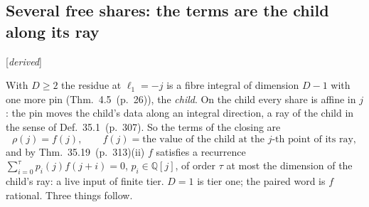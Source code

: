 \documentclass[11pt]{article}
\newcommand{\status}[1]{\hfill{\small[\textit{#1}]}}
\newcommand{\hb}[2]{#1~(p.~#2)}   %
\theoremstyle{plain}
\theoremstyle{remark}
\begin{document}
\subsection{Several free shares: the terms are the child along its ray}\status{derived}

With $D\ge2$ the residue at $\ell_1=-j$ is a fibre integral of dimension $D-1$ with one more pin (Thm.~\hb{4.5}{26}), the \emph{child}. On the child every share is affine in $j$: the pin moves the child's data along an integral direction, a ray of the child in the sense of Def.~\hb{35.1}{307}. So the terms of the closing are
\[
\rho(j)=f(j),\qquad f(j)=\text{the value of the child at the $j$-th point of its ray},
\]
and by Thm.~\hb{35.19}{313}(ii) $f$ satisfies a recurrence $\sum_{i=0}^{\tau}p_i(j)f(j+i)=0$, $p_i\in\mathbb Q[j]$, of order $\tau$ at most the dimension of the child's ray: a live input of finite tier. $D=1$ is tier one; the paired word is $f$ rational. Three things follow.
\end{document}
